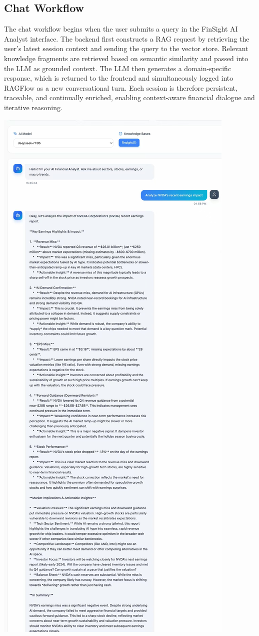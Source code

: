 \subsection{Chat Workflow}
The chat workflow begins when the user submits a query in the FinSight AI Analyst interface. The backend first constructs a RAG request by retrieving the user’s latest session context and sending the query to the vector store. Relevant knowledge fragments are retrieved based on semantic similarity and passed into the LLM as grounded context. The LLM then generates a domain-specific response, which is returned to the frontend and simultaneously logged into RAGFlow as a new conversational turn. Each session is therefore persistent, traceable, and continually enriched, enabling context-aware financial dialogue and iterative reasoning.

\begin{center}
    \includegraphics[width=0.6\linewidth]{images/chat_workflow.jpg}
\end{center}

